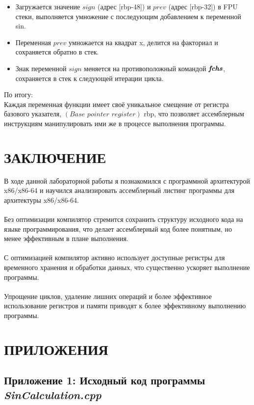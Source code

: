 \documentclass[12pt,a4paper]{article}
\numberwithin{subsection}{section}
\begin{document}
\begin{enumerate}
\begin{itemize}
    \item Загружается значение $\textit{sign}$ (адрес [rbp-48]) и $\textit{prev}$ (адрес [rbp-32]) 
    в FPU стеки, выполняется умножение с последующим добавлением к переменной sin.
    \item Переменная $\textit{prev}$ умножается на квадрат x, делится на факториал 
    и сохраняется обратно в стек.
    \item Знак переменной $\textit{sign}$ меняется на противоположный командой $\textbf{\textit{fchs}}$, 
    сохраняется в стек к следующей итерации цикла.
\end{itemize}

По итогу: \\
Каждая переменная функции имеет своё уникальное смещение от регистра базового указателя,
$(\textit{Base pointer register})$ rbp, что позволяет ассемблерным инструкциям 
манипулировать ими же в процессе выполнения программы.

\end{enumerate}


\section{ЗАКЛЮЧЕНИЕ}
В ходе данной лабораторной работы я познакомился с программной архитектурой x86/x86-64 
и научился анализировать ассемблерный листинг программы для архитектуры x86/x86-64.
\\
\\
Без оптимизации компилятор стремится сохранить структуру исходного кода на языке 
программирования, что делает ассемблерный код более понятным, но менее эффективным 
в плане выполнения.
\\
\\
С оптимизацией компилятор активно использует доступные регистры для временного 
хранения и обработки данных, что существенно ускоряет выполнение программы.
\\
\\
Упрощение циклов, удаление лишних операций и более эффективное использование 
регистров и памяти приводят к более эффективному выполнению программы.

\newpage


\section{ПРИЛОЖЕНИЯ}\label{app:listing}

\subsection*{Приложение 1: Исходный код программы \textit{SinCalculation.cpp}}\label{app:app1}
\end{document}
